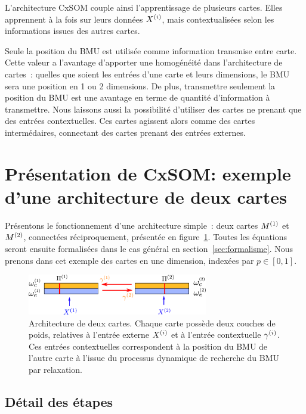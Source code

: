 \documentclass[../main]{subfiles}
\begin{document}
L'architecture CxSOM couple ainsi l'apprentissage de plusieurs cartes. Elles apprennent à la fois sur leurs données $X^{({i})}$, mais contextualisées selon les informations issues des autres cartes.

Seule la position du BMU est utilisée comme information transmise entre carte. Cette valeur a l'avantage d'apporter une homogénéité dans l'architecture de cartes~: quelles que soient les entrées d'une carte et leurs dimensions, le BMU sera une position en 1 ou 2 dimensions. De plus, transmettre seulement la position du BMU est une avantage en terme de quantité d'information à transmettre.
Nous laissons aussi la possibilité d'utiliser des cartes ne prenant que des entrées contextuelles. Ces cartes agissent alors comme des cartes intermédaires, connectant des cartes prenant des entrées externes.

\section{Présentation de CxSOM: exemple d'une architecture de deux cartes}

Présentons le fonctionnement d'une architecture simple~: deux cartes $M^{({1})}$ et $M^{({2})}$, connectées réciproquement, présentée en figure~\ref{fig:2som_archi}. Toutes les équations seront ensuite formalisées dans le cas général en section~\ref{sec:formalisme}. 
Nous prenons dans cet exemple des cartes en une dimension, indexées par $p \in [0,1]$.
\begin{figure}[ht]
    \centering
    \includegraphics[width=0.7\textwidth]{archi_2som}
    \caption{Architecture de deux cartes. Chaque carte possède deux couches de poids, relatives à l'entrée externe $X^{({i})}$ et à l'entrée contextuelle $\gamma^{({i})}$.
    Ces entrées contextuelles correspondent à la position du BMU de l'autre carte à l'issue du processus dynamique de recherche du BMU par relaxation.
    \label{fig:2som_archi}}
    \end{figure}
\subsection{Détail des étapes}
\end{document}

